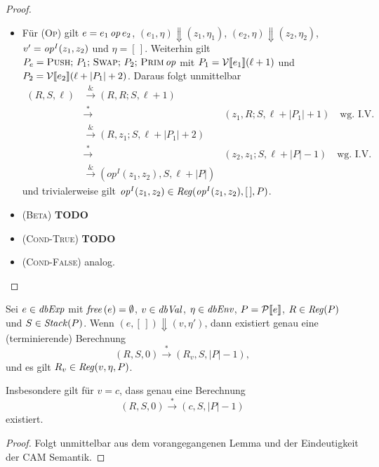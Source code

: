 \documentclass[12pt,fleqn]{article}
\newcommand{\RN}[1]{\mbox{\textsc{(#1)}}}
\begin{document}
\begin{proof}
\begin{itemize}
  \item F\"ur \RN{Op} gilt $e = e_1\,{\text{\it op\/}}\,e_2$, $(e_1,\eta) \Downarrow (z_1,\eta_1)$,
    $(e_2,\eta) \Downarrow (z_2,\eta_2)$,
    $v' = {\text{\it op\/}}^I(z_1,z_2)$ und $\eta = [\,]$. Weiterhin gilt
    $P_e = \textsc{Push};\,P_1;\,\textsc{Swap};\,P_2;\,\textsc{Prim}\,{\text{\it op\/}}$ mit
    $P_1=\mathcal{V}\llbracket e_1 \rrbracket(\ell+1)$ und $P_2=\mathcal{V}\llbracket e_2 \rrbracket(\ell+|P_1|+2)$. Daraus folgt unmittelbar
    \[\begin{array}{rcl}
      (R,S,\ell)
      &\xrightarrow& (R,R;S,\ell+1) \\
      &\xrightarrow*& (z_1,R;S,\ell+|P_1|+1) \quad \text{wg. I.V.} \\
      &\xrightarrow& (R,z_1;S,\ell+|P_1|+2) \\
      &\xrightarrow*& (z_2,z_1;S,\ell+|P|-1) \quad \text{wg. I.V.} \\
      &\xrightarrow& (op^I(z_1,z_2),S,\ell+|P|)
    \end{array}\]
    und trivialerweise gilt ${\text{\it op\/}}^I(z_1,z_2) \in {\text{\it Reg\/}}({\text{\it op\/}}^I(z_1,z_2),[\,],P)$.

  \item \RN{Beta} {\bf TODO}

  \item \RN{Cond-True} {\bf TODO}
    
  \item \RN{Cond-False} analog.
  \end{itemize}
\end{proof}

\begin{theorem}
  Sei $e\in{\text{\it dbExp\/}}$ mit ${\text{\it free\/}}\,(e)=\emptyset$, $v\in{\text{\it dbVal\/}}$, $\eta\in{\text{\it dbEnv\/}}$, $P=\mathcal{P}\llbracket e \rrbracket$, $R\in{\text{\it Reg\/}}(P)$
  und $S\in{\text{\it Stack\/}}(P)$. Wenn $(e,[\,])\Downarrow(v,\eta')$, dann existiert genau eine (terminierende) Berechnung
  \[(R,S,0) \xrightarrow* (R_v,S,|P|-1),\]
  und es gilt $R_v\in{\text{\it Reg\/}}(v,\eta,P)$.
\end{theorem}

Insbesondere gilt f\"ur $v=c$, dass genau eine Berechnung \[(R,S,0) \xrightarrow* (c,S,|P|-1)\] existiert.

\begin{proof}
  Folgt unmittelbar aus dem vorangegangenen Lemma und der Eindeutigkeit der CAM Semantik.
\end{proof}
\end{document}
